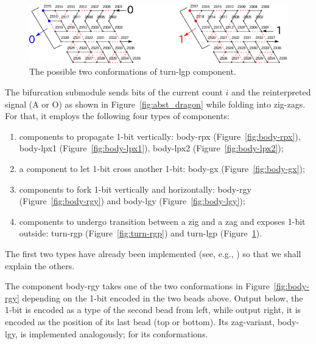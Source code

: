\begin{figure}[h]
\centering
\includegraphics[width=0.8\linewidth]{pic/turn-lgp.pdf}
\caption{The possible two conformations of turn-lgp component.}
\label{fig:turn-lgp}
\end{figure}



The bifurcation submodule sends bits of the current count $i$ and the reinterpreted signal (A or O) as shown in Figure~\ref{fig:abst_dragon} while folding into zig-zags.
For that, it employs the following four types of components: 
\begin{enumerate}[itemsep=0pt]
\item components to propagate 1-bit vertically: body-rpx (Figure~\ref{fig:body-rpx}), body-lpx1 (Figure~\ref{fig:body-lpx1}), body-lpx2 (Figure~\ref{fig:body-lpx2}); 
\item a component to let 1-bit cross another 1-bit: body-gx (Figure~\ref{fig:body-gx}); 
\item components to fork 1-bit vertically and horizontally: body-rgy (Figure~\ref{fig:body-rgy}) and body-lgy (Figure~\ref{fig:body-lgy});  
\item components to undergo transition between a zig and a zag and exposes 1-bit outside: turn-rgp (Figure~\ref{fig:turn-rgp}) and turn-lgp (Figure~\ref{fig:turn-lgp}). 
\end{enumerate} 
The first two types have already been implemented (see, e.g., \cite{HaKiOtSe2016}) so that we shall explain the others.

The component body-rgy takes one of the two conformations in Figure~\ref{fig:body-rgy} depending on the 1-bit encoded in the two beads above.
Output below, the 1-bit is encoded as a type of the second bead from left, while output right, it is encoded as the position of its last bead (top or bottom).
Its zag-variant, body-lgy, is implemented analogously; for its conformations.

